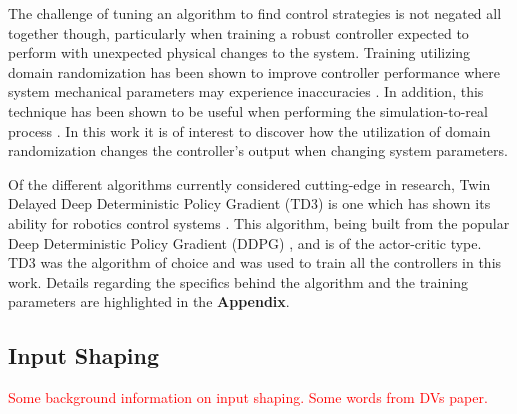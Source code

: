 \documentclass[letterpaper, 10 pt, conference]{ieeeconf}  %
\begin{document}
The challenge of tuning an algorithm to find control strategies is not negated all together though, particularly when training a robust controller expected to perform with unexpected physical changes to the system. Training utilizing domain randomization has been shown to improve controller performance where system mechanical parameters may experience inaccuracies \cite{}. In addition, this technique has been shown to be useful when performing the simulation-to-real process \cite{}. In this work it is of interest to discover how the utilization of domain randomization changes the controller's output when changing system parameters. 

Of the different algorithms currently considered cutting-edge in research, Twin Delayed Deep Deterministic Policy Gradient (TD3) is one which has shown its ability for robotics control systems \cite{}. This algorithm, being built from the popular Deep Deterministic Policy Gradient (DDPG) \cite{}, and is of the actor-critic type. TD3 was the algorithm of choice and was used to train all the controllers in this work. Details regarding the specifics behind the algorithm and the training parameters are highlighted in the \textbf{Appendix}.

\subsection{Input Shaping}
\textcolor{red}{Some background information on input shaping. Some words from DVs paper.}
\end{document}
